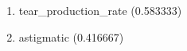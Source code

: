 \begin{enumerate}
\item tear\_production\_rate (0.583333)
\item astigmatic (0.416667)
\end{enumerate}